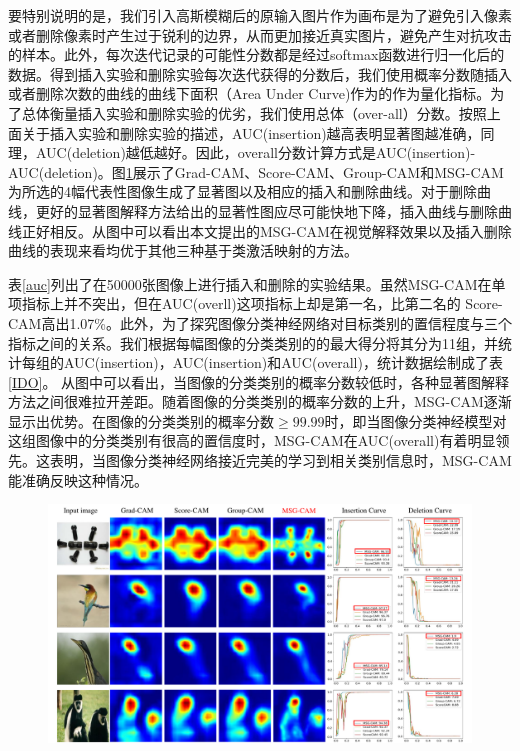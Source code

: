 要特别说明的是，我们引入高斯模糊后的原输入图片作为画布是为了避免引入像素或者删除像素时产生过于锐利的边界，从而更加接近真实图片，避免产生对抗攻击的样本。此外，每次迭代记录的可能性分数都是经过softmax函数进行归一化后的数据。得到插入实验和删除实验每次迭代获得的分数后，我们使用概率分数随插入或者删除次数的曲线的曲线下面积（Area Under Curve)作为的作为量化指标。为了总体衡量插入实验和删除实验的优劣，我们使用总体（over-all）分数。按照上面关于插入实验和删除实验的描述，AUC(insertion)越高表明显著图越准确，同理，AUC(deletion)越低越好。因此，overall分数计算方式是AUC(insertion)-AUC(deletion)。图\ref{fig:IDCurve}展示了Grad-CAM、Score-CAM、Group-CAM和MSG-CAM为所选的4幅代表性图像生成了显著图以及相应的插入和删除曲线。对于删除曲线，更好的显著图解释方法给出的显著性图应尽可能快地下降，插入曲线与删除曲线正好相反。从图中可以看出本文提出的MSG-CAM在视觉解释效果以及插入删除曲线的表现来看均优于其他三种基于类激活映射的方法。


表\ref{auc}列出了在50000张图像上进行插入和删除的实验结果。虽然MSG-CAM在单项指标上并不突出，但在AUC(overll)这项指标上却是第一名，比第二名的 Score-CAM高出1.07\%。此外，为了探究图像分类神经网络对目标类别的置信程度与三个指标之间的关系。我们根据每幅图像的分类类别的的最大得分将其分为11组，并统计每组的AUC(insertion)，AUC(insertion)和AUC(overall)，统计数据绘制成了表\ref{IDO}。 从图中可以看出，当图像的分类类别的概率分数较低时，各种显著图解释方法之间很难拉开差距。随着图像的分类类别的概率分数的上升，MSG-CAM逐渐显示出优势。在图像的分类类别的概率分数$\geq 99.99$时，即当图像分类神经模型对这组图像中的分类类别有很高的置信度时，MSG-CAM在AUC(overall)有着明显领先。这表明，当图像分类神经网络接近完美的学习到相关类别信息时，MSG-CAM能准确反映这种情况。


\begin{figure}[h]
	\centering 
	\includegraphics[width=15cm]{fig/ch3/IDCurve.pdf}
	\label{fig:IDCurve}
\end{figure}


